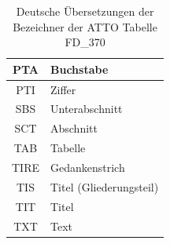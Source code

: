 \begin{table}[H]
\begin{tabular}{|c|l|}
            PTA & Buchstabe \\\hline
            PTI & Ziffer \\\hline
            SBS & Unterabschnitt \\\hline
            SCT & Abschnitt \\\hline
            TAB & Tabelle \\\hline
            TIRE & Gedankenstrich \\\hline
            TIS & Titel (Gliederungsteil) \\\hline
            TIT & Titel \\\hline
            TXT & Text \\\hline
        \end{tabular}
        \caption{Deutsche Übersetzungen der Bezeichner der ATTO Tabelle FD\_370}
        \label{tab:fd_370}
    \end{table}
    
